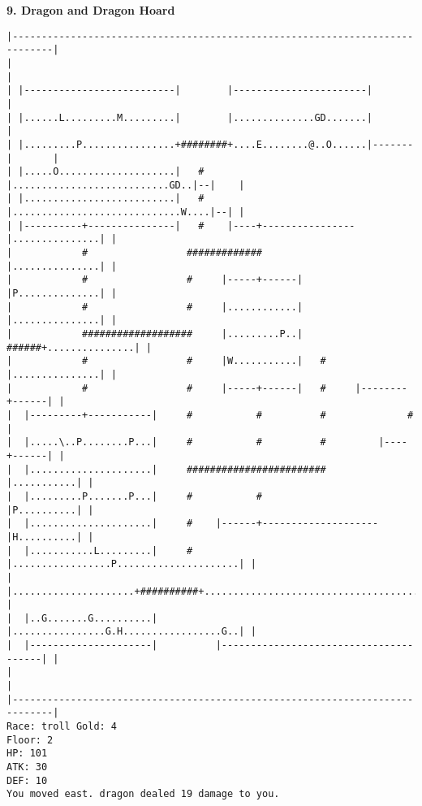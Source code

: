 \documentclass[11pt]{article}
\theoremstyle{plain}
\begin{document}
\textbf{9. Dragon and Dragon Hoard}

\begin{Verbatim}[fontsize=\scriptsize]
|-----------------------------------------------------------------------------|
|                                                                             |
| |--------------------------|        |-----------------------|               |
| |......L.........M.........|        |..............GD.......|               |
| |.........P................+########+....E........@..O......|-------|       |
| |.....O....................|   #    |...........................GD..|--|    |
| |..........................|   #    |.............................W....|--| |
| |----------+---------------|   #    |----+----------------|...............| |
|            #                 #############                |...............| |
|            #                 #     |-----+------|         |P..............| |
|            #                 #     |............|         |...............| |
|            ###################     |.........P..|   ######+...............| |
|            #                 #     |W...........|   #     |...............| |
|            #                 #     |-----+------|   #     |--------+------| |
|  |---------+-----------|     #           #          #              #        |
|  |.....\..P........P...|     #           #          #         |----+------| |
|  |.....................|     ########################         |...........| |
|  |.........P.......P...|     #           #                    |P..........| |
|  |.....................|     #    |------+--------------------|H..........| |
|  |...........L.........|     #    |.................P.....................| |
|  |.....................+##########+.......................................| |
|  |..G.......G..........|          |................G.H.................G..| |
|  |---------------------|          |---------------------------------------| |
|                                                                             |
|-----------------------------------------------------------------------------|
Race: troll Gold: 4                                                    Floor: 2
HP: 101
ATK: 30
DEF: 10
You moved east. dragon dealed 19 damage to you. 
\end{Verbatim}
\end{document}
